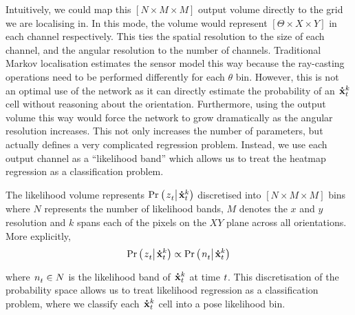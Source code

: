 \documentclass[letterpaper, 10 pt, conference]{ieeeconf}  %
\begin{document}
Intuitively, we could map this \ensuremath{[N \times M \times M]} output volume directly to the grid we are localising in.
In this mode, the volume would represent \ensuremath{[\Theta \times X \times Y]} in each channel respectively.
This ties the spatial resolution to the size of each channel, and the angular resolution to the number of channels.
Traditional Markov localisation estimates the sensor model this way because the ray-casting operations need to be performed differently for each \ensuremath{\theta} bin.
However, this is not an optimal use of the network as it can directly estimate the probability of an \ensuremath{\pose{\mytime}{k}} cell without reasoning about the orientation.
Furthermore, using the output volume this way would force the network to grow dramatically as the angular resolution increases.
This not only increases the number of parameters, but actually defines a very complicated regression problem.
Instead, we use each output channel as a ``likelihood band'' which allows us to treat the heatmap regression as a classification problem.

The likelihood volume represents \ensuremath{\condprob{\obs{\mytime}{}}{\pose{\mytime}{k}}} discretised into \ensuremath{[N \times M \times M]} bins where \ensuremath{N} represents the number of likelihood bands, \ensuremath{M} denotes the \ensuremath{x} and \ensuremath{y} resolution and \ensuremath{k} spans each of the pixels on the \ensuremath{XY} plane across all orientations.
More explicitly, 
\begin{equation}
    \condprob{\obs{\mytime}{}}{\pose{\mytime}{k}} \propto \condprob{\easysca{n}{t}{}}{\pose{\mytime}{k}}
    \label{eq:cla}
\end{equation}
where \ensuremath{\easysca{n}{t}{} \in N} is the likelihood band of \ensuremath{\pose{\mytime}{k}} at time \ensuremath{\mytime}.
This discretisation of the probability space allows us to treat likelihood regression as a classification problem, where we classify each \ensuremath{\pose{\mytime}{k}} cell into a pose likelihood bin.
\end{document}
